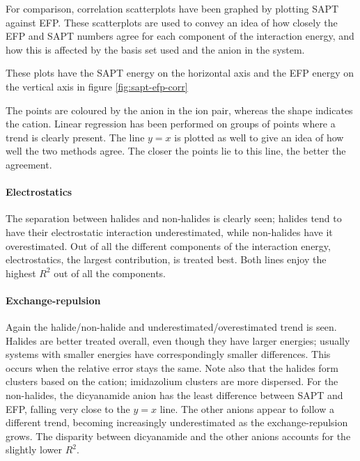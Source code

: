 

For comparison, correlation scatterplots have been graphed by plotting SAPT against EFP.
These scatterplots are used to convey an idea of how closely the EFP and SAPT numbers agree for each component of the interaction energy, and how this is affected by the basis set used and the anion in the system.


These plots have the SAPT energy on the horizontal axis and the EFP energy on the vertical axis in figure 
\ref{fig:sapt-efp-corr}

The points are coloured by the anion in the ion pair, whereas the shape indicates the cation.
Linear regression has been performed on groups of points where a trend is clearly present.
The line $ y = x $ is plotted as well to give an idea of how well the two methods agree.
The closer the points lie to this line, the better the agreement. 

\paragraph{Electrostatics}
The separation between halides and non-halides is clearly seen; halides tend to have their electrostatic interaction underestimated, while non-halides have it overestimated. 
Out of all the different components of the interaction energy, electrostatics, the largest contribution, is treated best. 
Both lines enjoy the highest $R^2$ out of all the components.

\paragraph{Exchange-repulsion}
Again the halide/non-halide and underestimated/overestimated trend is seen. 
Halides are better treated overall, even though they have larger energies; usually systems with smaller energies have correspondingly smaller differences.
This occurs when the relative error stays the same.
Note also that the halides form clusters based on the cation; imidazolium clusters are  more dispersed.
For the non-halides, the dicyanamide anion has the least difference between SAPT and EFP, falling very close to the $y = x$ line.
The other anions appear to follow a different trend, becoming increasingly underestimated as the exchange-repulsion grows.
The disparity between dicyanamide and the other anions accounts for the slightly lower $R^2$.

